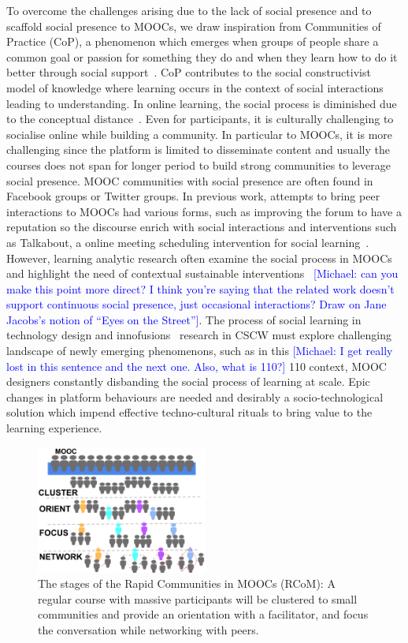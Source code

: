 \documentclass[format=acmsmall, review=false, screen=true]{acmart}
\newcommand{\msb}[1]{{\textcolor{blue}{ [Michael: #1]}}}
\begin{document}
To overcome the challenges arising due to the lack of social presence and to scaffold social presence to MOOCs, we draw inspiration from Communities of Practice (CoP), a phenomenon which emerges when groups of people share a common goal or passion for something they do and when they learn how to do it better through social support~\cite{wenger1999communities}. CoP contributes to the social constructivist model of knowledge where learning occurs in the context of social interactions leading to understanding. In online learning, the social process is diminished due to the conceptual distance~\cite{olson2000distance}. Even for participants, it is culturally challenging to socialise online while building a community. In particular to MOOCs, it is more challenging since the platform is limited to disseminate content and usually the courses does not span for longer period to build strong communities to leverage social presence. MOOC communities with social presence are often found in Facebook groups or Twitter groups. In previous work, attempts to bring peer interactions to MOOCs had various forms, such as improving the forum to have a reputation so the discourse enrich with social interactions and interventions such as Talkabout, a online meeting scheduling intervention for social learning~\cite{kulkarni2015talkabout}. However, learning analytic research often examine the social process in MOOCs and highlight the need of contextual sustainable interventions~\cite{poquet2018mooc} \msb{can you make this point more direct? I think you're saying that the related work doesn't support continuous social presence, just occasional interactions? Draw on Jane Jacobs's notion of ``Eyes on the Street''}. The process of social learning in technology design and innofusions~\cite{williams2005social} research in CSCW must explore challenging landscape of newly emerging phenomenons, such as in this \msb{I get really lost in this sentence and the next one. Also, what is 110?}
110
 context, MOOC designers constantly disbanding the social process of learning at scale. Epic changes in platform behaviours are needed and desirably a socio-technological solution which impend effective techno-cultural rituals to bring value to the learning experience. 

\begin{figure}[h]
 \centering
 \includegraphics[width=0.5\textwidth]{images/Framework.png}
 \caption{The stages of the Rapid Communities in MOOCs (RCoM): A regular course with massive participants will be clustered to small communities and provide an orientation with a facilitator, and focus the conversation while networking with peers.}
 \label{fig:framework}
\end{figure}
\end{document}
